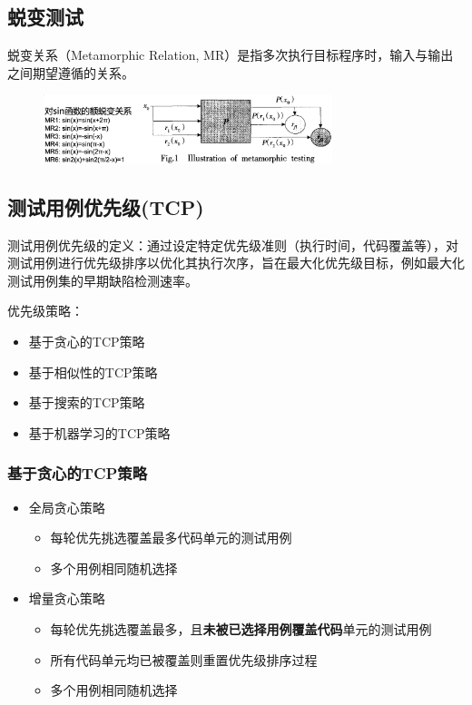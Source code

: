 \subsection{蜕变测试}
蜕变关系（Metamorphic Relation, MR）是指多次执行目标程序时，输入与输出之间期望遵循的关系。
\begin{figure}[H]
    \vspace{-0.5em}
	\centering
	\includegraphics[width=0.75\textwidth]{images/蜕变测试.png}
    \vspace{-1em}
\end{figure}

\subsection{测试用例优先级(TCP)}

测试用例优先级的定义：通过设定特定优先级准则（执行时间，代码覆盖等），对测试用例进行优先级排序以优化其执行次序，旨在最大化优先级目标，例如最大化测试用例集的早期缺陷检测速率。

优先级策略：
\begin{itemize}
    \item 基于贪心的TCP策略
    \item 基于相似性的TCP策略
    \item 基于搜索的TCP策略
    \item 基于机器学习的TCP策略
\end{itemize}

\subsubsection{基于贪心的TCP策略}

\begin{itemize}
    \item 全局贪心策略
    \begin{itemize}
        \item 每轮优先挑选覆盖最多代码单元的测试用例
        \item 多个用例相同随机选择
    \end{itemize}
    \item 增量贪心策略
    \begin{itemize}
        \item 每轮优先挑选覆盖最多，且\textbf{未被已选择用例覆盖代码}单元的测试用例
        \item 所有代码单元均已被覆盖则重置优先级排序过程
        \item 多个用例相同随机选择
    \end{itemize}
\end{itemize}

